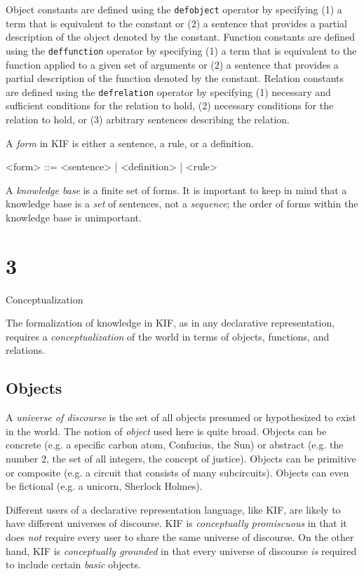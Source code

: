 Object constants are defined using the {\tt defobject} operator by specifying
(1) a term that is equivalent to the constant or (2) a sentence that provides a
partial description of the object denoted by the constant.  Function constants
are defined using the {\tt deffunction} operator  by specifying (1) a term that
is equivalent to the function applied to a given set of arguments or (2) a
sentence that provides a partial description of the function denoted by the
constant.  Relation constants are defined using the {\tt defrelation} operator by
specifying (1) necessary and sufficient conditions for the relation to hold,
(2) necessary conditions for the relation to hold, or (3) arbitrary sentences
describing the relation.

A {\it form} in KIF is either a sentence, a rule, or a definition.  

\medskip
\beginverbatim
<form> ::= <sentence> | <definition> | <rule>
\endverbatim
\medskip

A {\it  knowledge base} is a finite set of forms.  It is important to keep in
mind that a knowledge base is a {\it set} of sentences, not a {\it sequence};
the order of forms within the knowledge base is unimportant.

\vfill\eject

\chapter{3}{Conceptualization}

The formalization of knowledge in KIF, as in any declarative representation,
requires a {\it conceptualization} of the world in terms of objects,
functions, and relations.

\section{Objects}

A {\it universe of discourse} is the set of all objects presumed or
hypothesized to exist in the world.  The notion of {\it object} used here is
quite broad.  Objects can be concrete (e.g. a specific carbon atom, Confucius,
the Sun) or abstract (e.g. the number 2, the set of all integers, the concept
of justice).  Objects can be primitive or composite (e.g. a circuit that
consists of many subcircuits).  Objects can even be fictional (e.g. a unicorn,
Sherlock Holmes).

Different users of a declarative representation language, like KIF, are likely
to have different universes of discourse.  KIF is {\it conceptually
promiscuous} in that it does {\it not} require every user to share the same
universe of discourse.  On the other hand, KIF is {\it conceptually grounded}
in that every  universe of discourse {\it is} required to include certain {\it
basic} objects.  

